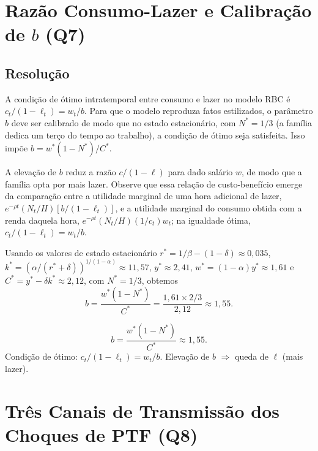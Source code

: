 \documentclass[12pt, a4paper]{article}
\begin{document}
\section{Razão Consumo-Lazer e Calibração de $b$ (Q7)}

\subsection*{Resolução}

A condição de ótimo intratemporal entre consumo e lazer no modelo RBC é $c_t/(1-\ell_t) = w_t/b$. Para que o modelo reproduza fatos estilizados, o parâmetro $b$ deve ser calibrado de modo que no estado estacionário, com $N^* = 1/3$ (a família dedica um terço do tempo ao trabalho), a condição de ótimo seja satisfeita. Isso impõe $b = w^*(1-N^*)/C^*$.

A elevação de $b$ reduz a razão $c/(1-\ell)$ para dado salário $w$, de modo que a família opta por mais lazer. Observe que essa relação de custo-benefício emerge da comparação entre a utilidade marginal de uma hora adicional de lazer, $e^{-\rho t}(N_t/H)[b/(1-\ell_t)]$, e a utilidade marginal do consumo obtida com a renda daquela hora, $e^{-\rho t}(N_t/H)(1/c_t)w_t$; na igualdade ótima, $c_t/(1-\ell_t) = w_t/b$.

Usando os valores de estado estacionário $r^* = 1/\beta - (1-\delta) \approx 0{,}035$, $k^* = (\alpha/(r^*+\delta))^{1/(1-\alpha)} \approx 11{,}57$, $y^* \approx 2{,}41$, $w^* = (1-\alpha)y^* \approx 1{,}61$ e $C^* = y^* - \delta k^* \approx 2{,}12$, com $N^* = 1/3$, obtemos
\[
b = \frac{w^*(1-N^*)}{C^*} = \frac{1{,}61 \times 2/3}{2{,}12} \approx 1{,}55.
\]

\begin{resultbox}[title={Calibração do Parâmetro $b$ (Q7)}]
\[
b = \frac{w^*(1-N^*)}{C^*} \approx 1{,}55.
\]
Condição de ótimo: $c_t/(1-\ell_t) = w_t/b$. Elevação de $b$ $\Rightarrow$ queda de $\ell$ (mais lazer).
\end{resultbox}

\section{Três Canais de Transmissão dos Choques de PTF (Q8)}
\end{document}
